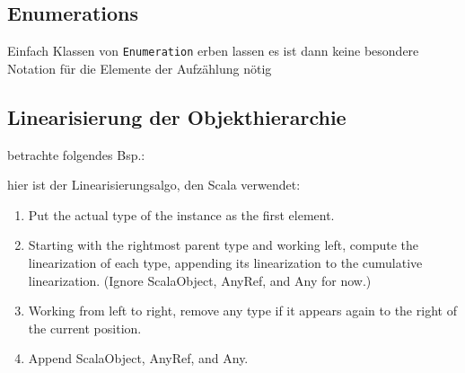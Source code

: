 \subsection{Enumerations}
Einfach Klassen von \texttt{Enumeration} erben lassen \und es ist dann
keine besondere Notation für die Elemente der Aufzählung nötig




\subsection{Linearisierung der Objekthierarchie}
betrachte folgendes Bsp.:




hier ist der Linearisierungsalgo, den Scala verwendet:

\begin{enumerate}
  \item Put the actual type of the instance as the first element.
  \item Starting with the rightmost parent type and working left, compute the linearization
of each type, appending its linearization to the cumulative linearization. (Ignore
ScalaObject, AnyRef, and Any for now.)
  \item Working from left to right, remove any type if it appears again to the right of the
current position.
  \item Append ScalaObject, AnyRef, and Any.
\end{enumerate}
\pagebreak


